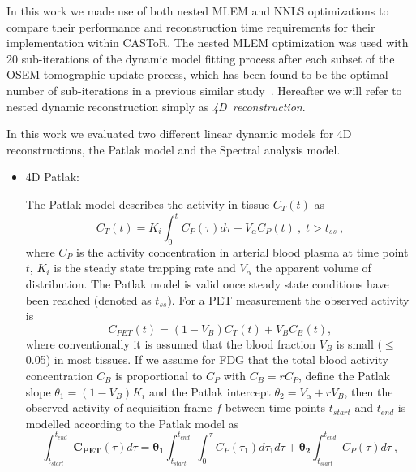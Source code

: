 In this work we made use of both nested MLEM and NNLS optimizations to compare their performance and reconstruction time requirements for their implementation within CASToR. 
The nested MLEM optimization was used with 20 sub-iterations of the dynamic model fitting process after each subset of the OSEM tomographic update process, which has been found to be the optimal number of sub-iterations in a previous similar study~\cite{Karakatsanis2016a}.  
Hereafter we will refer to nested dynamic reconstruction simply as \mbox{\textit{4D reconstruction}}. 

In this work we evaluated two different linear dynamic models for 4D reconstructions, the Patlak model and the Spectral analysis model.

\begin{itemize}
\item 4D Patlak: 

The Patlak model describes the activity in tissue ${C_{T}}(t)$ as
\begin{equation} \label{Patlak}
{C_{T}}(t) = {K_i} \int_{0}^{t} C_{P}(\tau) d\tau +  {V_{\alpha}} C_{P}(t) \ , \;  t>t_{ss} \ ,
\end{equation}
where $C_{P}$ is the activity concentration in arterial blood plasma at time point $t$, $K_i$ is the steady state trapping rate and $V_{\alpha}$ the apparent volume of distribution. The Patlak model is valid once steady state conditions have been reached (denoted as $t_{ss}$). 
For a PET measurement the observed activity is
\begin{equation} \label{C_PET}
{C_{PET}}(t)  = (1-V_{B}){C_{T}}(t) + V_{B}C_{B}(t),
\end{equation}
where conventionally it is assumed that the blood fraction $V_B$ is small ($	\leq$0.05) in most tissues. If we assume for FDG that the total blood activity concentration $C_{B}$ is proportional to $C_{P}$ with $C_{B} = r C_{P}$, define the Patlak slope $\theta_1 = (1-V_{B})K_i$ and the Patlak intercept $\theta_2 = V_{\alpha}+r V_{B}$, then the observed activity of acquisition frame $f$ between time points $t_{start}$ and $t_{end}$ is modelled according to the Patlak model as
\begin{equation} \label{PatlakEq}
\int_{t_{start}}^{t_{end}} \boldsymbol{C_{PET}}(\tau) d\tau = \boldsymbol{\theta_1} \int_{t_{start}}^{t_{end}}\int_{0}^{\tau} C_{P}(\tau_1) d\tau_1 d\tau + \boldsymbol{\theta_2} \int_{t_{start}}^{t_{end}} C_{P}(\tau) d\tau  \ ,
\end{equation}


\end{itemize}
